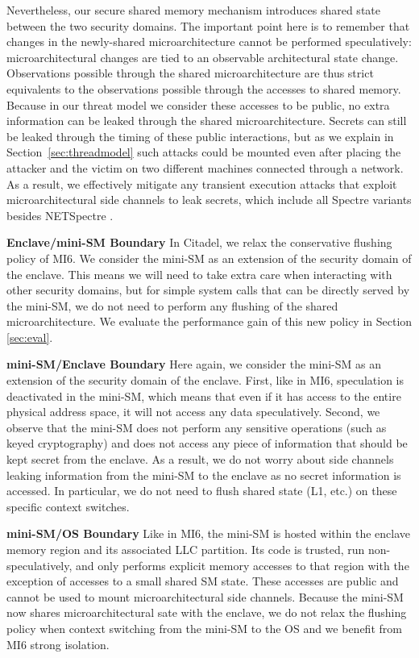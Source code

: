 Nevertheless, our secure shared memory mechanism introduces shared state between the two security domains. 
The important point here is to remember that changes in the newly-shared microarchitecture cannot be performed speculatively:
microarchitectural changes are tied to an observable architectural state change.
Observations possible through the shared microarchitecture are thus strict equivalents to the observations possible through the accesses to shared memory.
Because in our threat model we consider these accesses to be public, no extra information can be leaked through the shared microarchitecture. 
Secrets can still be leaked through the timing of these public interactions, but as we explain in Section~\ref{sec:threadmodel} such attacks could be mounted even after placing the attacker and the victim on two different machines connected through a network.
As a result, we effectively mitigate any transient execution attacks that exploit microarchitectural side channels to leak secrets, which include all Spectre variants besides NETSpectre \cite{schwarz2019netspectre}.

\textbf{Enclave/mini-SM Boundary}
In Citadel, we relax the conservative flushing policy of MI6.
We consider the mini-SM as an extension of the security domain of the enclave.
This means we will need to take extra care when interacting with other security domains, but for simple system calls that can be directly served by the mini-SM, we do not need to perform any flushing of the shared microarchitecture.
We evaluate the performance gain of this new policy in Section \ref{sec:eval}.

\textbf{mini-SM/Enclave Boundary}
Here again, we consider the mini-SM as an extension of the security domain of the enclave.
First, like in MI6, speculation is deactivated in the mini-SM, which means that even if it has access to the entire physical address space, it will not access any data speculatively.
Second, we observe that the mini-SM does not perform any sensitive operations (such as keyed cryptography) and does not access any piece of information that should be kept secret from the enclave.
As a result, we do not worry about side channels leaking information from the mini-SM to the enclave as no secret information is accessed.
In particular, we do not need to flush shared state (L1, etc.) on these specific context switches.

\textbf{mini-SM/OS Boundary}
Like in MI6, the mini-SM is hosted within the enclave memory region and its associated LLC partition. 
Its code is trusted, run non-speculatively, and only performs explicit memory accesses to that region with the exception of accesses to a small shared SM state. 
These accesses are public and cannot be used to mount microarchitectural side channels.
Because the mini-SM now shares microarchitectural sate with the enclave, we do not relax the flushing policy when context switching from the mini-SM to the OS and we benefit from MI6 strong isolation.

